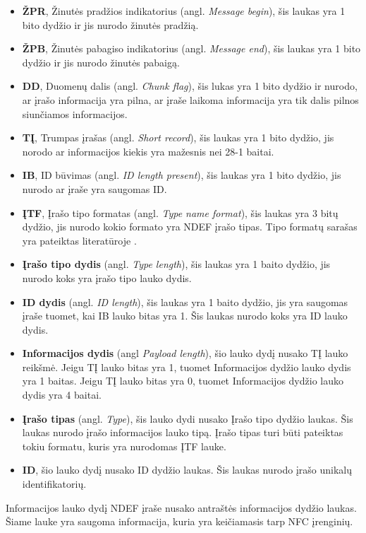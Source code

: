 \begin{itemize}
    \item \textbf{ŽPR}, Žinutės pradžios indikatorius (angl. \textit{Message begin}), šis laukas yra 1 bito dydžio ir jis nurodo žinutės pradžią.
    \item \textbf{ŽPB}, Žinutės pabagiso indikatorius (angl. \textit{Message end}), šis laukas yra 1 bito dydžio ir jis nurodo žinutės pabaigą.
    \item \textbf{DD}, Duomenų dalis (angl. \textit{Chunk flag}), šis lukas yra 1 bito dydžio ir nurodo, ar įrašo informacija yra pilna, ar įraše laikoma informacija yra tik dalis pilnos siunčiamos informacijos.
    \item \textbf{TĮ}, Trumpas įrašas (angl. \textit{Short record}), šis laukas yra 1 bito dydžio, jis norodo ar informacijos kiekis yra mažesnis nei 2\textup{8}-1 baitai.
    \item \textbf{IB}, ID būvimas (angl. \textit{ID length present}), šis laukas yra 1 bito dydžio, jis nurodo ar įraše yra saugomas ID.
    \item \textbf{ĮTF}, Įrašo tipo formatas (angl. \textit{Type name format}), šis laukas yra 3 bitų dydžio, jis nurodo kokio formato yra NDEF įrašo tipas. Tipo formatų sarašas yra pateiktas literatūroje \cite{Leora1980}.
    \item \textbf{Įrašo tipo dydis} (angl. \textit{Type length}), šis laukas yra 1 baito dydžio, jis nurodo koks yra įrašo tipo lauko dydis.
    \item \textbf{ID dydis} (angl. \textit{ID length}), šis laukas yra 1 baito dydžio, jis yra saugomas įraše tuomet, kai IB lauko bitas yra 1. Šis laukas nurodo koks yra ID lauko dydis.
    \item \textbf{Informacijos dydis} (angl \textit{Payload length}), šio lauko dydį nusako TĮ lauko reikšmė. Jeigu TĮ lauko bitas yra 1, tuomet Informacijos dydžio lauko dydis yra 1 baitas. Jeigu TĮ lauko bitas yra 0, tuomet Informacijos dydžio lauko dydis yra 4 baitai.
    \item \textbf{Įrašo tipas} (angl. \textit{Type}), šis lauko dydi nusako Įrašo tipo dydžio laukas. Šis laukas nurodo įrašo informacijos lauko tipą. Įrašo tipas turi būti pateiktas tokiu formatu, kuris yra nurodomas ĮTF lauke.
    \item \textbf{ID}, šio lauko dydį nusako ID dydžio laukas. Šis laukas nurodo įrašo unikalų identifikatorių.
\end{itemize}
Informacijos lauko dydį NDEF įraše nusako antraštės informacijos dydžio laukas. Šiame lauke yra saugoma informacija, kuria yra keičiamasis tarp NFC įrenginių.

